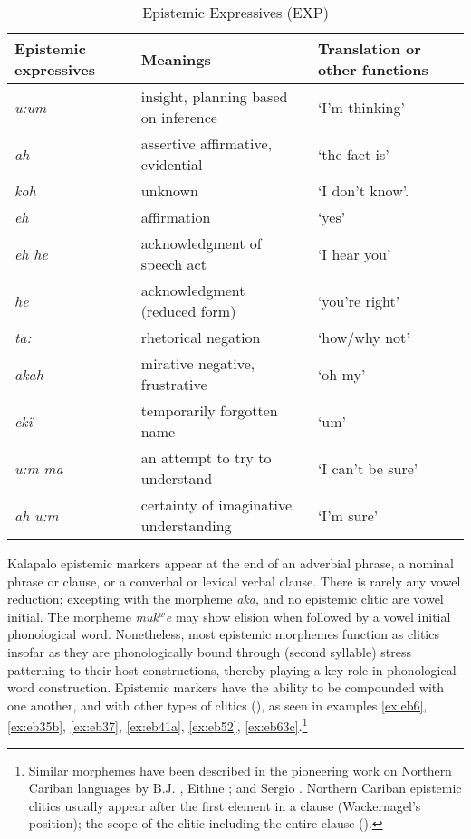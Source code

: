\documentclass[output=paper]{langsci/langscibook}
\begin{document}
\begin{table}
\begin{tabularx}{\textwidth}{lL{3.5cm}L{3.5cm}}
\hline
\textbf{Epistemic expressives} & \textbf{Meanings} & \textbf{Translation or other functions}\\
\hline
\textit{	u:um	}	&	insight, planning based on inference	&	‘I’m thinking’	\\
\textit{	ah	}	&	assertive affirmative, evidential	&	‘the fact is’	\\
\textit{	koh	}	&	unknown	&	‘I don’t know’.	\\
\textit{	eh	}	&	affirmation	&	‘yes’	\\
\textit{	eh he	}	&	acknowledgment of speech act	&	‘I hear you’	\\
\textit{	he	}	&	acknowledgment (reduced form)	&	‘you’re right’	\\
\textit{	ta:	}	&	rhetorical negation	&	‘how/why not’	\\
\textit{	akah	}	&	mirative negative, frustrative	&	‘oh my’	\\
\textit{	ekï	}	&	temporarily forgotten name	&	‘um’	\\
\textit{	u:m ma	}	&	an attempt to try to understand	&	‘I can’t be sure’	\\
\textit{	ah u:m	}	&	certainty of imaginative understanding	&	‘I’m sure’	\\
\hline
\end{tabularx}
\caption{Epistemic Expressives (EXP)}
\label{tab:eb2}
\end{table}
\clearpage

Kalapalo epistemic markers appear at the end of an adverbial phrase, a nominal phrase or clause, or a converbal or lexical verbal clause. There is rarely any vowel reduction; excepting with the morpheme \textit{aka}, and no epistemic clitic are vowel initial.  The morpheme \textit{muk$^w$e} may show elision when followed by a vowel initial phonological word.  Nonetheless, most epistemic morphemes function as clitics insofar as they are phonologically bound through (second syllable) stress patterning to their host constructions, thereby playing a key role in phonological word construction.  Epistemic markers have the ability to be compounded with one another, and with other types of clitics (\citealt{Basso2014}), as seen in examples \ref{ex:eb6}, \ref{ex:eb35b}, \ref{ex:eb37}, \ref{ex:eb41a},  \ref{ex:eb52}, \ref{ex:eb63c}.\footnote{Similar morphemes have been described in the pioneering work on Northern Cariban languages  by  B.J. \cite{Hoff1986}, Eithne \cite{Carlin2004}; and  Sergio \cite{Meira1999}.  Northern  Cariban epistemic clitics usually appear after the first element in a clause (Wackernagel’s position); the scope of the clitic including the entire clause (\citealt{Hoff1986}).}
 
\end{document}
